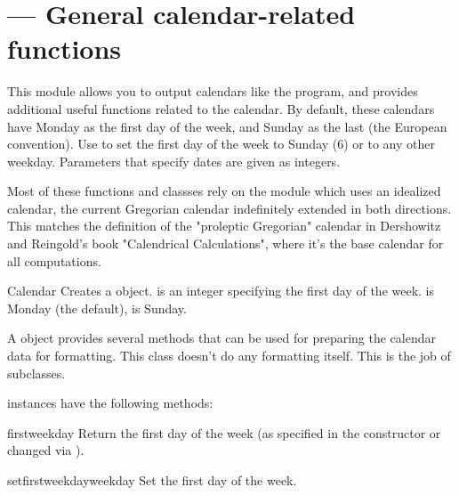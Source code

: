 \section{ ---
         General calendar-related functions}


This module allows you to output calendars like the \UNIX{}
 program, and provides additional useful functions
related to the calendar. By default, these calendars have Monday as
the first day of the week, and Sunday as the last (the European
convention). Use  to set the first day of the
week to Sunday (6) or to any other weekday.  Parameters that specify
dates are given as integers.

Most of these functions and classses rely on the 
module which uses an idealized calendar, the current Gregorian
calendar indefinitely extended in both directions.  This matches
the definition of the "proleptic Gregorian" calendar in Dershowitz
and Reingold's book "Calendrical Calculations", where it's the
base calendar for all computations.

\begin{classdesc}{Calendar}{}
Creates a  object.  is an integer
specifying the first day of the week.  is Monday (the default),
 is Sunday.

A  object provides several methods that can
be used for preparing the calendar data for formatting. This
class doesn't do any formatting itself. This is the job of
subclasses.
\end{classdesc}

 instances have the following methods:

\begin{methoddesc}{firstweekday}{}
Return the first day of the week (as specified in the constructor
or changed via ).
\end{methoddesc}

\begin{methoddesc}{setfirstweekday}{weekday}
Set the first day of the week.
\end{methoddesc}

